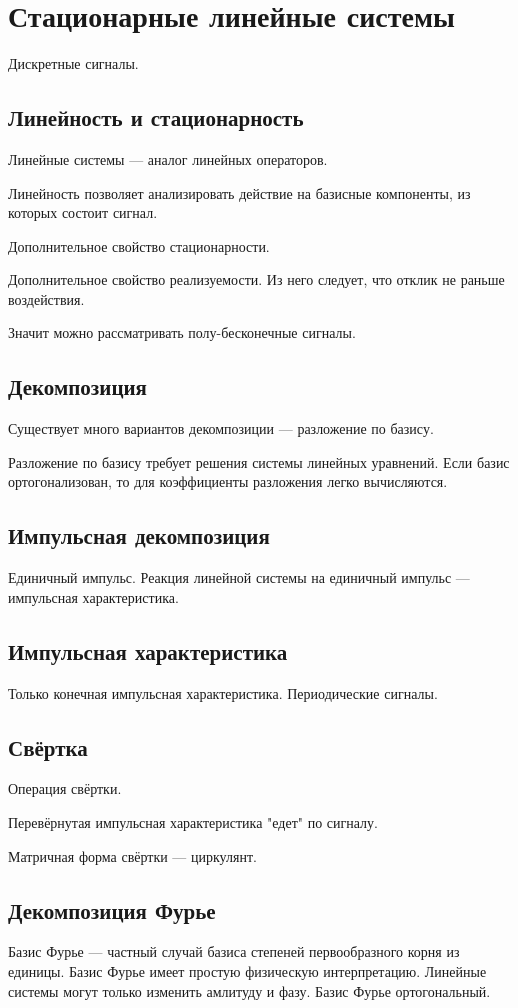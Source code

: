 \chapter{Стационарные линейные системы}

Дискретные сигналы.

\section{Линейность и стационарность}

Линейные системы --- аналог линейных операторов.

Линейность позволяет анализировать действие на базисные компоненты, из которых состоит сигнал.

Дополнительное свойство стационарности.

Дополнительное свойство реализуемости. Из него следует, что отклик не раньше воздействия.

Значит можно рассматривать полу-бесконечные сигналы.

\section{Декомпозиция}

Существует много вариантов декомпозиции --- разложение по базису.

Разложение по базису требует решения системы линейных уравнений.
Если базис ортогонализован, то для коэффициенты разложения легко вычисляются.

\section{Импульсная декомпозиция}

Единичный импульс.
Реакция линейной системы на единичный импульс --- импульсная характеристика.

\section{Импульсная характеристика}

Только конечная импульсная характеристика.
Периодические сигналы.

\section{Свёртка}

Операция свёртки.

Перевёрнутая импульсная характеристика "едет"{} по сигналу.

Матричная форма свёртки --- циркулянт.


\section{Декомпозиция Фурье}

Базис Фурье --- частный случай базиса степеней первообразного корня из единицы.
Базис Фурье имеет простую физическую интерпретацию.
Линейные системы могут только изменить амлитуду и фазу.
Базис Фурье ортогональный.